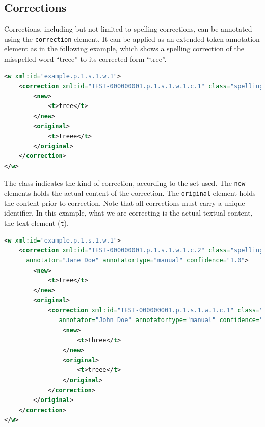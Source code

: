 \documentclass[a4paper,12pt]{report}
\begin{document}
\subsection{Corrections}

Corrections, including but not limited to spelling corrections, can be annotated using the \texttt{correction} element. It can be applied as an extended token annotation element as in the following example, which shows a spelling correction of the misspelled word ``treee'' to its corrected form ``tree''.

\begin{lstlisting}[language=xml]
<w xml:id="example.p.1.s.1.w.1">
    <correction xml:id="TEST-000000001.p.1.s.1.w.1.c.1" class="spelling">
        <new>
            <t>tree</t>
        </new>
        <original>
            <t>treee</t>
        </original>
    </correction>
</w>
\end{lstlisting}

The class indicates the kind of correction, according to the set used. The \texttt{new} elements holds the actual content of the correction. The \texttt{original} element holds the content prior to correction. Note that all corrections must carry a unique identifier. In this example, what we are correcting is the actual textual content, the text element (\texttt{t}).


\begin{lstlisting}[language=xml]
<w xml:id="example.p.1.s.1.w.1">
    <correction xml:id="TEST-000000001.p.1.s.1.w.1.c.2" class="spelling" 
      annotator="Jane Doe" annotatortype="manual" confidence="1.0">
        <new>
            <t>tree</t>
        </new>
        <original>
            <correction xml:id="TEST-000000001.p.1.s.1.w.1.c.1" class="spelling"
               annotator="John Doe" annotatortype="manual" confidence="0.6">
                <new>
                    <t>three</t>
                </new>
                <original>
                    <t>treee</t>
                </original>
            </correction>
        </original>
    </correction>
</w>
\end{lstlisting}
\end{document}
